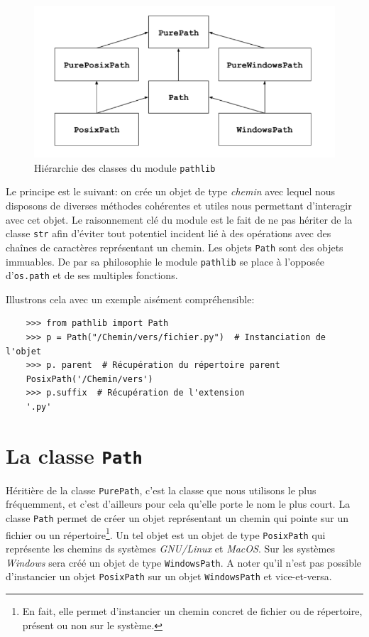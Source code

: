 \documentclass[a4paper,12pt]{book}
\begin{document}
\begin{figure}[h]
\begin{center}
\includegraphics[scale=0.5]{IMG/Pathlib-01.png}
\caption{Hiérarchie des classes du module \texttt{pathlib}}
\end{center}
\end{figure}
\medskip

Le principe est le suivant: on crée un objet de type \textit{chemin} avec lequel nous disposons de diverses méthodes cohérentes et utiles nous permettant d'interagir avec cet objet. Le raisonnement clé du module est le fait de ne pas hériter de la classe \texttt{str} afin d'éviter tout potentiel incident lié à des opérations avec des chaînes de caractères représentant un chemin. Les objets \texttt{Path} sont des objets immuables. De par sa philosophie le module \texttt{pathlib} se place à l'opposée d'\texttt{os.path} et de ses multiples fonctions.
\medskip

Illustrons cela avec un exemple aisément compréhensible:
\begin{verbatim}
    >>> from pathlib import Path
    >>> p = Path("/Chemin/vers/fichier.py")  # Instanciation de l'objet
    >>> p. parent  # Récupération du répertoire parent
    PosixPath('/Chemin/vers')
    >>> p.suffix  # Récupération de l'extension
    '.py'
\end{verbatim}
\medskip

\section{La classe \texttt{Path}}
Héritière de la classe \texttt{PurePath}, c'est la classe que nous utilisons le plus fréquemment, et c'est d'ailleurs pour cela qu'elle porte le nom le plus court. La classe \texttt{Path} permet de créer un objet représentant un chemin qui pointe sur un fichier ou un répertoire\footnote{En fait, elle permet d'instancier un chemin concret de fichier ou de répertoire, présent ou non sur le système.}. Un tel objet est un objet de type \texttt{PosixPath} qui représente les chemins ds systèmes \textit{GNU/Linux} et \textit{MacOS}. Sur les systèmes \textit{Windows} sera créé un objet de type \texttt{WindowsPath}. A noter qu'il n'est pas possible d'instancier un objet \texttt{PosixPath} sur un objet \texttt{WindowsPath} et vice-et-versa.
\medskip
\end{document}
